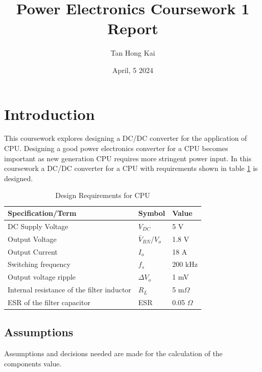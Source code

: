 \documentclass{article}
\title{Power Electronics Coursework 1 Report}
\author{Tan Hong Kai}
\date{April, 5 2024}
\begin{document}
\maketitle

\section{Introduction}

This coursework explores designing a DC/DC converter for the application of CPU.
Designing a good power electronics converter for a CPU becomes important as new generation CPU requires more stringent power input.
In this coursework a DC/DC converter for a CPU with requirements shown in table \ref{tab:cpu-requirement} is designed.

\begin{table}[ht]
    \label{tab:cpu-requirement}
    \caption[Design Requirements]{Design Requirements for CPU}
    \centering
    \begin{tabular}{| l | l | l |}
        \hline
        Specification/Term                         & Symbol                 & Value         \\
        \hline
        DC Supply Voltage                          & $V_{DC}$               & 5 V           \\
        Output Voltage                             & $\bar{V}_{BN}$/$V_{o}$ & 1.8 V         \\
        Output Current                             & $I_{o}$                & 18 A          \\
        Switching frequency                        & $f_s$                  & 200 kHz       \\
        Output voltage ripple                      & $\Delta{}V_o$          & 1 mV          \\
        Internal resistance of the filter inductor & $R_L$                  & 5 m$\Omega$   \\
        ESR of the filter capacitor                & ESR                    & 0.05 $\Omega$ \\
        \hline
    \end{tabular}
\end{table}

\subsection{Assumptions}

Assumptions and decisions needed are made for the calculation of the components value.
\end{document}
